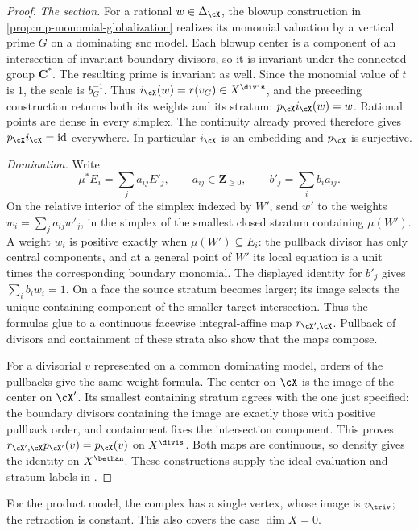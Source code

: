 \begin{proof}
\emph{The section.}
For a rational $w\in\Delta_{\cX}$, the blowup construction in
\cref{prop:mp-monomial-globalization} realizes its monomial
valuation by a vertical prime $G$ on a dominating snc model.
Each blowup center is a component of an intersection of
invariant boundary divisors, so it is invariant under the
connected group $\mathbf C^*$. The resulting prime is invariant
as well. Since the monomial value of $t$ is $1$, the scale
is $b_G^{-1}$. Thus $i_{\cX}(w)=r(v_G)\in X^{\divis}$,
and the preceding construction returns both its weights and
its stratum: $p_{\cX}i_{\cX}(w)=w$.
Rational points are dense in every simplex. The continuity
already proved therefore gives $p_{\cX}i_{\cX}=\mathrm{id}$
everywhere. In particular $i_{\cX}$ is an embedding and
$p_{\cX}$ is surjective.

\emph{Domination.}
Write
\[
 \mu^*E_i=\sum_j a_{ij}E'_j,\qquad
 a_{ij}\in\mathbf Z_{\geq0},\qquad
 b'_j=\sum_i b_i a_{ij}.
\]
On the relative interior of the simplex indexed by $W'$,
send $w'$ to the weights
$w_i=\sum_j a_{ij}w'_j$, in the simplex of the smallest
closed stratum containing $\mu(W')$. A weight $w_i$ is
positive exactly when $\mu(W')\subseteq E_i$: the pullback
divisor has only central components, and at a general point
of $W'$ its local equation is a unit times the corresponding
boundary monomial. The displayed identity for $b'_j$ gives
$\sum_i b_iw_i=1$. On a face the source stratum becomes
larger; its image selects the unique containing component
of the smaller target intersection. Thus the formulas glue
to a continuous facewise integral-affine map $r_{\cX',\cX}$.
Pullback of divisors and containment of these strata also
show that the maps compose.

For a divisorial $v$ represented on a common dominating
model, orders of the pullbacks give the same weight formula.
The center on $\cX$ is the image of the center on $\cX'$.
Its smallest containing stratum agrees with the one just
specified: the boundary divisors containing the image are
exactly those with positive pullback order, and containment
fixes the intersection component. This proves
$r_{\cX',\cX}p_{\cX'}(v)=p_{\cX}(v)$ on $X^{\divis}$.
Both maps are continuous, so density gives the identity on
$X^{\bethan}$. These constructions supply the ideal evaluation
and stratum labels in \cite[Section~3.1.1, pp.~28--29]{MPTropicalV2}.
\end{proof}

For the product model, the complex has a single vertex,
whose image is $v_{\triv}$; the retraction is constant.
This also covers the case $\dim X=0$.

